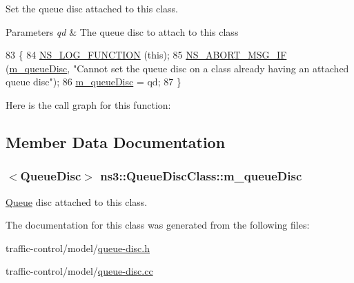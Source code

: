 Set the queue disc attached to this class. 


\begin{DoxyParams}{Parameters}
{\em qd} & The queue disc to attach to this class \\
\hline
\end{DoxyParams}

\begin{DoxyCode}
83 \{
84   \hyperlink{log-macros-disabled_8h_a90b90d5bad1f39cb1b64923ea94c0761}{NS\_LOG\_FUNCTION} (\textcolor{keyword}{this});
85   \hyperlink{group__fatal_ga6653324225bc139e46deea177614ceee}{NS\_ABORT\_MSG\_IF} (\hyperlink{classns3_1_1QueueDiscClass_af64dcbcca42cf3e54f638864aa03e5cb}{m\_queueDisc}, \textcolor{stringliteral}{"Cannot set the queue disc on a class already
       having an attached queue disc"});
86   \hyperlink{classns3_1_1QueueDiscClass_af64dcbcca42cf3e54f638864aa03e5cb}{m\_queueDisc} = qd;
87 \}
\end{DoxyCode}


Here is the call graph for this function\+:




\subsection{Member Data Documentation}
\subsubsection[{\texorpdfstring{m\+\_\+queue\+Disc}{m_queueDisc}}]{$<${\bf Queue\+Disc}$>$ ns3\+::\+Queue\+Disc\+Class\+::m\+\_\+queue\+Disc\hspace{0.3cm}{\ttfamily [private]}}\hypertarget{classns3_1_1QueueDiscClass_af64dcbcca42cf3e54f638864aa03e5cb}{}\label{classns3_1_1QueueDiscClass_af64dcbcca42cf3e54f638864aa03e5cb}


\hyperlink{classns3_1_1Queue}{Queue} disc attached to this class. 



The documentation for this class was generated from the following files\+:\begin{DoxyCompactItemize}
\item 
traffic-\/control/model/\hyperlink{queue-disc_8h}{queue-\/disc.\+h}\item 
traffic-\/control/model/\hyperlink{queue-disc_8cc}{queue-\/disc.\+cc}\end{DoxyCompactItemize}
